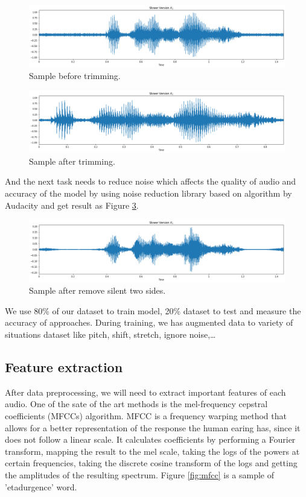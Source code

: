 \documentclass[%
  article,%
  10pt,%
  a4paper,%
  fleqn,%
  oneside,%
  sumario = tradicional,%
  chapter = TITLE,%
  section = TITLE,%
]{abntex2}
\begin{document}
\begin{figure}[H]
  \centering
  \includegraphics[width = 0.8\columnwidth]{./Figuras/sample_1}
   \caption{Sample before trimming.}
  \label{fig:sample_1}
\end{figure}

\begin{figure}[H]
  \centering
   \includegraphics[width = 0.8\columnwidth]{./Figuras/sample_2}
    \caption{Sample after trimming.}
  \label{fig:sample_2}
\end{figure}

And the next task needs to reduce noise which affects the quality of audio and accuracy of the model by using noise reduction library based on algorithm by Audacity and get result as Figure \ref{fig:sample_3}.
\begin{figure}[H]
  \centering
   \includegraphics[width = 0.8\columnwidth]{./Figuras/sample_3}
    \caption{Sample after remove silent two sides.}
  \label{fig:sample_3}
\end{figure}

We use 80\% of our dataset to train model, 20\% dataset to test and measure the accuracy of approaches. During training, we has augmented data to variety of situations dataset like pitch, shift, stretch, ignore noise,\dots

\subsection{Feature extraction}

After data preprocessing, we will need to extract important features of each audio. One of the sate of the art methods is the mel-frequency cepstral coefficients (MFCCs) algorithm. MFCC is a frequency warping method that allows for a better representation of the response the human earing has, since it does not follow a linear scale. It calculates coefficients by performing a Fourier transform, mapping the result to the mel scale, taking the logs of the powers at certain frequencies, taking the discrete cosine transform of the logs and getting the amplitudes of the resulting spectrum. Figure \ref{fig:mfcc} is a sample of 'etadurgence' word. 
\end{document}
